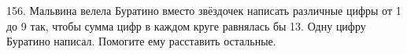 156. Мальвина велела Буратино вместо звёздочек написать различные цифры от 1 до 9 так, чтобы сумма цифр в каждом круге равнялась бы 13. Одну цифру Буратино написал. Помогите ему расставить остальные.
\begin{center}
\begin{figure}[ht!]
\end{figure}
\end{center}
